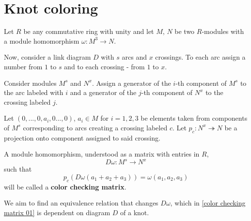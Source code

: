 \section{Knot coloring}

Let $R$ be any commutative ring with unity and let $M$, $N$ be two $R$-modules with a module homomorphism $\omega:M^3\to N$.

Now, consider a link diagram $D$ with $s$ arcs and $x$ crossings. To each arc assign a number from $1$ to $s$ and to each crossing - from $1$ to $x$.
\medskip

\begin{definition}\label{color checking matrix 01}
  Consider modules $M^s$ and $N^x$. Assign a generator of the $i$-th component of $M^s$ to the arc labeled with $i$ and a generator of the $j$-th component of $N^x$ to the crossing labeled $j$. 

  Let $(0,...,0,a_i,0...,0)$, $a_i\in M$ for $i=1,2,3$ be elements taken from components of $M^s$ corresponding to arcs creating a crossing labeled $c$. Let $p_c:N^x\twoheadrightarrow N$ be a projection onto component assigned to said crossing.



  A module homomorphism, understood as a matrix with entries in $R$,
  $$D\omega:M^s\to N^x$$
  such that 
  $$ p_c(D\omega(a_1+a_2+a_3))=\omega(a_1, a_2, a_3) $$
  will be called a \textbf{color checking matrix}.
\end{definition}

We aim to find an equivalence relation that changes $D\omega$, which in \cref{color checking matrix 01} is dependent on diagram $D$ of a knot.
